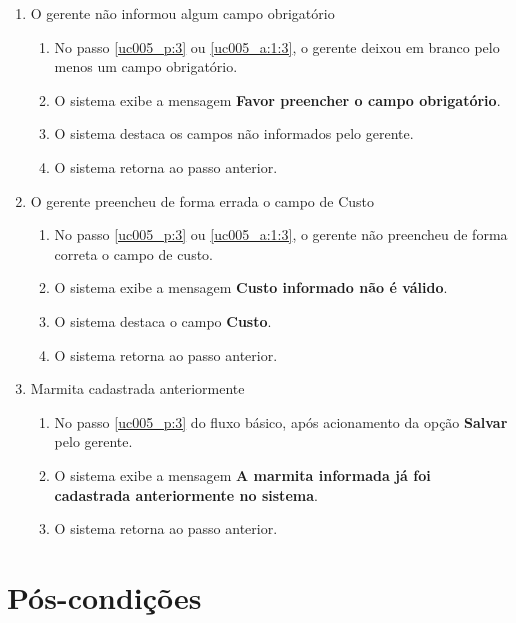 \begin{enumerate}[label=E\arabic*]	
	\item O gerente não informou algum campo obrigatório \label{uc005_e:1}
	\begin{enumerate}[label*=.\arabic*]
		\item[] No passo \ref{uc005_p:3} ou \ref{uc005_a:1:3}, o gerente deixou em branco pelo menos um campo obrigatório.
		\item O sistema exibe a mensagem \textbf{Favor preencher o campo obrigatório}.
		\item O sistema destaca os campos não informados pelo gerente.
		\item O sistema retorna ao passo anterior.
	\end{enumerate}
	
	\item O gerente preencheu de forma errada o campo de Custo \label{uc005_e:2}
	\begin{enumerate}[label*=.\arabic*]		
		\item[] No passo \ref{uc005_p:3} ou \ref{uc005_a:1:3}, o gerente não preencheu de forma correta o campo de custo.		
		\item O sistema exibe a mensagem \textbf{Custo informado não é válido}.
		\item O sistema destaca o campo \textbf{Custo}.
		\item O sistema retorna ao passo anterior.
	\end{enumerate}
		
	\item Marmita cadastrada anteriormente \label{uc005_e:3}
	\begin{enumerate}[label*=.\arabic*]
		\item[] No passo \ref{uc005_p:3} do fluxo básico, após acionamento da opção \textbf{Salvar} pelo gerente.
		\item O sistema exibe a mensagem \textbf{A marmita informada já foi cadastrada anteriormente no sistema}.
		\item O sistema retorna ao passo anterior.
	\end{enumerate}
\end{enumerate}

\section{Pós-condições}

